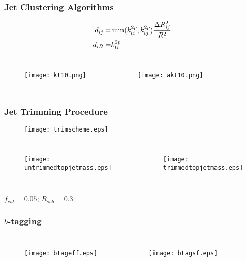 \begin{frame}[t, noframenumbering, label=jet_clustering]
    \frametitle{Jet Clustering Algorithms}
    \centering
    \begin{align*}
        d_{ij} = & \min(k_{ti}^{2p}, k_{tj}^{2p})
        \frac{\Delta R_{ij}^2}{R^2} \\
        d_{iB} = & k_{ti}^{2p}
    \end{align*}

    \begin{columns}

    \begin{figure}
    \centering
    \texttt{[image: kt10.png]}
    \end{figure}

    \begin{figure}
    \centering
    \texttt{[image: akt10.png]}
    \end{figure}

\end{columns}

\end{frame}

\begin{frame}[noframenumbering,label=trimming]
    \frametitle{Jet Trimming Procedure}
\begin{figure}
\centering
\texttt{[image: trimscheme.eps]}
\end{figure}
\begin{columns}
\begin{figure}
\centering
\texttt{[image: untrimmedtopjetmass.eps]}
\end{figure}
\begin{figure}
\centering
\texttt{[image: trimmedtopjetmass.eps]}
\end{figure}
\end{columns}
    \centering
    $f_{cut} = 0.05$; $R_{sub} = 0.3$
\end{frame}


\begin{frame}[noframenumbering,label=btagging]
    \frametitle{$b$-tagging}
    \centering
\begin{columns}
\begin{figure}
\centering
\texttt{[image: btageff.eps]}
\end{figure}
\begin{figure}
\centering
\texttt{[image: btagsf.eps]}
\end{figure}
\end{columns}
\end{frame}

